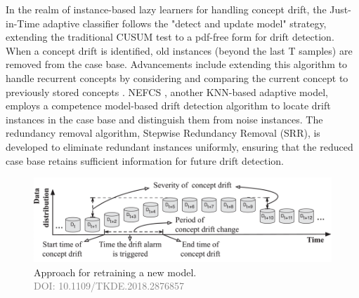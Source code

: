 \begin{enumerate}[label=\Alph*.]
    In the realm of instance-based lazy learners for handling concept drift, the Just-in-Time adaptive classifier \cite{alippi2008just}  follows the "detect and update model" strategy, extending the traditional CUSUM test \cite{manly2000cumulative} to a pdf-free form for drift detection. When a concept drift is identified, old instances (beyond the last T samples) are removed from the case base. Advancements include extending this algorithm to handle recurrent concepts by considering and comparing the current concept to previously stored concepts \cite{silva2013data} \cite{alippi2008just}. NEFCS \cite{lu2016concept}, another KNN-based adaptive model, employs a competence model-based drift detection algorithm \cite{lu2016concept} to locate drift instances in the case base and distinguish them from noise instances. The redundancy removal algorithm, Stepwise Redundancy Removal (SRR), is developed to eliminate redundant instances uniformly, ensuring that the reduced case base retains sufficient information for future drift detection.
    

\begin{figure}[!ht]
    \centering
    \includegraphics[width=.9\textwidth]{2_Background/figures/concept_drift_understanding.png}
    \caption{Approach for retraining a new model. \\ \textcolor{gray}{\fontsize{10}{0}\selectfont DOI: 10.1109/TKDE.2018.2876857}}
    \label{fig:concept-drift-adaptation}
\end{figure}






\end{enumerate}
